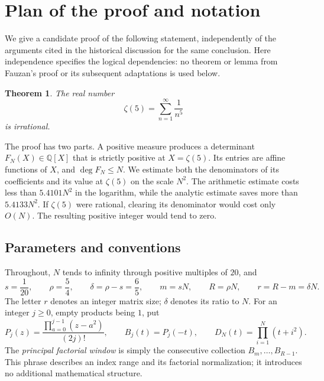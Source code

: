 \documentclass[11pt,letterpaper]{article}
\newtheorem{theorem}{Theorem}[section]
\theoremstyle{definition}
\newcommand{\Q}{\mathbb Q}
\begin{document}
\section{Plan of the proof and notation}\label{sec:plan}

We give a candidate proof of the following statement, independently of the
arguments cited in the historical discussion for the same conclusion.
Here independence specifies the logical dependencies: no theorem or lemma
from Fauzan's proof or its subsequent adaptations is used below.

\begin{theorem}\label{thm:main}
The real number
\[
  \zeta(5)=\sum_{n=1}^{\infty}\frac1{n^5}
\]
is irrational.
\end{theorem}

The proof has two parts. A positive measure produces a determinant
$F_N(X)\in\Q[X]$ that is strictly positive at $X=\zeta(5)$. Its entries are
affine functions of $X$, and $\deg F_N\le N$. We estimate both the denominators
of its coefficients and its value at $\zeta(5)$ on the scale $N^2$. The
arithmetic estimate costs less than $5.4101N^2$ in the logarithm, while the
analytic estimate saves more than $5.4133N^2$. If $\zeta(5)$ were rational,
clearing its denominator would cost only $O(N)$. The resulting positive
integer would tend to zero.

\subsection{Parameters and conventions}
Throughout, $N$ tends to infinity through positive multiples of $20$, and
\begin{equation}\label{eq:fixed-parameters}
 s=\frac1{20},\qquad \rho=\frac54,\qquad
 \delta=\rho-s=\frac65,\qquad
 m=sN,\qquad R=\rho N,\qquad r=R-m=\delta N.
\end{equation}
The letter $r$ denotes an integer matrix size; $\delta$ denotes its ratio to
$N$. For an integer $j\ge0$, empty products being $1$, put
\begin{equation}\label{eq:basic-polynomials}
 P_j(z)=\frac{\prod_{a=0}^{j-1}(z-a^2)}{(2j)!},\qquad
 B_j(t)=P_j(-t),\qquad
 D_N(t)=\prod_{i=1}^{N}(t+i^2).
\end{equation}
The \emph{principal factorial window} is simply the consecutive collection
$B_m,\ldots,B_{R-1}$. This phrase describes an index range and its factorial
normalization; it introduces no additional mathematical structure.
\end{document}
